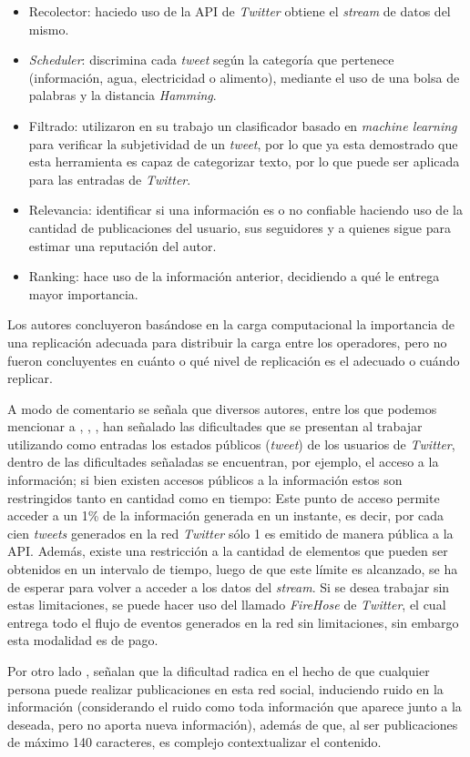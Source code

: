 \begin{itemize}
\item Recolector: haciedo uso de la API de \textit{Twitter} obtiene el \textit{stream} de datos del mismo. 
\item \textit{Scheduler}: discrimina cada \textit{tweet} según la categoría que pertenece (información, agua, electricidad o alimento), mediante el uso de una bolsa de palabras y la distancia \textit{Hamming}.
\item Filtrado: utilizaron en su trabajo un clasificador basado en \textit{machine learning} para verificar la subjetividad de un \textit{tweet}, por lo que ya esta demostrado que esta herramienta es capaz de categorizar texto, por lo que puede ser aplicada para las entradas de \textit{Twitter}.
\item Relevancia: identificar si una información es o no confiable haciendo uso de la cantidad de publicaciones del usuario, sus seguidores y a quienes sigue para estimar una reputación del autor.
\item Ranking: hace uso de la información anterior, decidiendo a qué le entrega mayor importancia.
\end{itemize}

Los autores concluyeron basándose en la carga computacional la importancia de una replicación adecuada para  distribuir la carga entre los operadores, pero no fueron concluyentes en cuánto o qué nivel de replicación es el adecuado o cuándo replicar.

A modo de comentario se señala que diversos autores, entre los que podemos mencionar a \cite{VanDeVoort}, \cite{EventDetectionInTwitter}, \cite{Maldonado}, han señalado las dificultades que se presentan al trabajar utilizando como entradas los estados públicos (\textit{tweet}) de los usuarios de \textit{Twitter}, dentro de las dificultades señaladas se encuentran, por ejemplo, el acceso a la información; si bien existen accesos públicos a la información estos son restringidos tanto en cantidad como en tiempo: Este punto de acceso permite acceder a un 1\% de la información generada en un instante, es decir, por cada cien \textit{tweets} generados en la red \textit{Twitter} sólo 1 es emitido de manera pública a la API. Además, existe una restricción a la cantidad de elementos que pueden ser obtenidos en un intervalo de tiempo, luego de que este límite es alcanzado, se ha de esperar para volver a acceder a los datos del \textit{stream}. Si se desea trabajar sin estas limitaciones, se puede hacer uso del llamado \textit{FireHose} de \textit{Twitter}, el cual entrega todo el flujo de eventos generados en la red sin limitaciones, sin embargo esta modalidad es de pago.

Por otro lado \cite{VanDeVoort}, señalan que la dificultad radica en el hecho de que cualquier persona puede realizar publicaciones en esta red social, induciendo ruido en la información (considerando el ruido como toda información que aparece junto a la deseada, pero no aporta nueva información), además de que, al ser publicaciones de máximo 140 caracteres, es complejo contextualizar el contenido.
